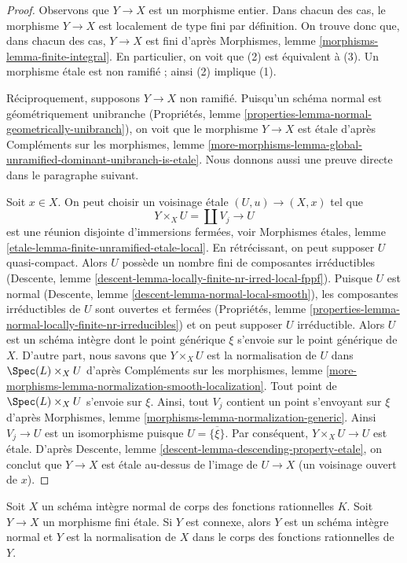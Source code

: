 \begin{proof}
Observons que $Y \to X$ est un morphisme entier.
Dans chacun des cas, le morphisme $Y \to X$ est localement de type fini
par définition.
On trouve donc que, dans chacun des cas, $Y \to X$ est fini d'après
Morphismes, lemme \ref{morphisms-lemma-finite-integral}.
En particulier, on voit que (2) est équivalent à (3).
Un morphisme étale est non ramifié ; ainsi (2) implique (1).

\medskip\noindent
Réciproquement, supposons $Y \to X$ non ramifié. Puisqu'un schéma normal est
géométriquement unibranche
(Propriétés, lemme \ref{properties-lemma-normal-geometrically-unibranch}),
on voit que le morphisme $Y \to X$ est étale d'après Compléments sur les morphismes, lemme
\ref{more-morphisms-lemma-global-unramified-dominant-unibranch-is-etale}.
Nous donnons aussi une preuve directe dans le paragraphe suivant.

\medskip\noindent
Soit $x \in X$.
On peut choisir un voisinage étale $(U, u) \to (X, x)$ tel que
$$
Y \times_X U = \coprod V_j \longrightarrow U
$$
est une réunion disjointe d'immersions fermées, voir
Morphismes étales, lemme \ref{etale-lemma-finite-unramified-etale-local}.
En rétrécissant, on peut supposer $U$ quasi-compact.
Alors $U$ possède un nombre fini de composantes irréductibles
(Descente, lemme \ref{descent-lemma-locally-finite-nr-irred-local-fppf}).
Puisque $U$ est normal
(Descente, lemme \ref{descent-lemma-normal-local-smooth}), les
composantes irréductibles de $U$ sont ouvertes et fermées
(Propriétés, lemme \ref{properties-lemma-normal-locally-finite-nr-irreducibles})
et on peut supposer $U$ irréductible. Alors $U$ est un schéma intègre
dont le point générique $\xi$ s'envoie sur le point générique de $X$.
D'autre part, nous savons que $Y \times_X U$
est la normalisation de $U$ dans $\Spec(L) \times_X U$
d'après Compléments sur les morphismes, lemme
\ref{more-morphisms-lemma-normalization-smooth-localization}.
Tout point de $\Spec(L) \times_X U$ s'envoie sur $\xi$.
Ainsi, tout $V_j$ contient un point s'envoyant sur $\xi$ d'après
Morphismes, lemme \ref{morphisms-lemma-normalization-generic}.
Ainsi $V_j \to U$ est un isomorphisme puisque $U = \overline{\{\xi\}}$.
Par conséquent, $Y \times_X U \to U$ est étale. D'après
Descente, lemme \ref{descent-lemma-descending-property-etale},
on conclut que $Y \to X$ est étale au-dessus de
l'image de $U \to X$ (un voisinage ouvert de $x$).
\end{proof}

\begin{lemma}
\label{lemma-finite-etale-covering-normal-unramified}
Soit $X$ un schéma intègre normal de corps des fonctions rationnelles $K$.
Soit $Y \to X$ un morphisme fini étale. Si $Y$ est connexe,
alors $Y$ est un schéma intègre normal et $Y$ est la normalisation
de $X$ dans le corps des fonctions rationnelles de $Y$.
\end{lemma}


